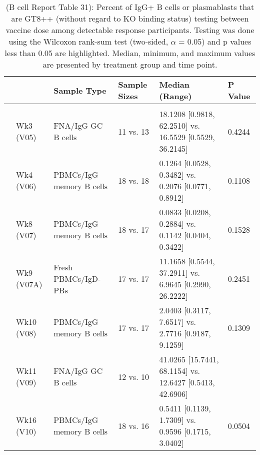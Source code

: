 \documentclass[
]{article}
\author{}
\date{\vspace{-2.5em}}
\begin{document}
\begin{table}[!h]

\caption[ (B cell Report Table 31): Percent of IgG+ B cells or plasmablasts that are GT8++ (without regard to KO binding status) testing between vaccine dose among detectable response participants]{\label{tab:bcell-tab-31} (B cell Report Table 31): Percent of IgG+ B cells or plasmablasts that are GT8++ (without regard to KO binding status) testing between vaccine dose among detectable response participants. Testing was done using the Wilcoxon rank-sum test (two-sided, $\alpha$ = 0.05) and p values less than 0.05 are highlighted. Median, minimum, and maximum values are presented by treatment group and time point.}
\centering
\fontsize{8}{10}\selectfont
\begin{tabular}[t]{llllll}
\toprule
 &  & Sample Type & Sample Sizes & Median (Range) & P Value\\
\midrule
\addlinespace[0.3em]
\multicolumn{6}{l}{\textbf{20µg vs. 100µg}}\\
\hspace{1em} & Wk3 (V05) & FNA/IgG GC B cells & 11 vs. 13 & 18.1208 [0.9818, 62.2510] vs. 16.5529 [0.5529, 36.2145] & 0.4244\\
\cmidrule{2-6}
\hspace{1em} & Wk4 (V06) & PBMCs/IgG memory B cells & 18 vs. 18 & 0.1264 [0.0528, 0.3482] vs. 0.2076 [0.0771, 0.8912] & 0.1108\\
\cmidrule{2-6}
\hspace{1em} & Wk8 (V07) & PBMCs/IgG memory B cells & 18 vs. 17 & 0.0833 [0.0208, 0.2884] vs. 0.1142 [0.0404, 0.3422] & 0.1528\\
\cmidrule{2-6}
\hspace{1em} & Wk9 (V07A) & Fresh PBMCs/IgD- PBs & 17 vs. 17 & 11.1658 [0.5544, 37.2911] vs. 6.9645 [0.2990, 26.2222] & 0.2451\\
\cmidrule{2-6}
\hspace{1em} & Wk10 (V08) & PBMCs/IgG memory B cells & 17 vs. 17 & 2.0403 [0.3117, 7.6517] vs. 2.7716 [0.9187, 9.1259] & 0.1309\\
\cmidrule{2-6}
\hspace{1em} & Wk11 (V09) & FNA/IgG GC B cells & 12 vs. 10 & 41.0265 [15.7441, 68.1154] vs. 12.6427 [0.5413, 42.6906] & \cellcolor{yellow}{0.0020}\\
\cmidrule{2-6}
\hspace{1em} & Wk16 (V10) & PBMCs/IgG memory B cells & 18 vs. 16 & 0.5411 [0.1139, 1.7309] vs. 0.9596 [0.1715, 3.0402] & 0.0504\\
\bottomrule
\end{tabular}
\end{table}
\end{document}
